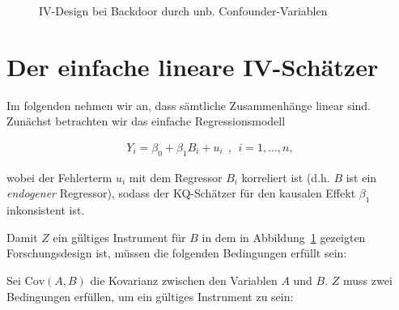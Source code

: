 \documentclass[
  a4paper,
  DIV=11,
  oneside]{scrreprt}
\begin{document}
\begin{figure}[t]


\caption{\label{fig-IVDAG1}IV-Design bei Backdoor durch unb.
Confounder-Variablen}

\end{figure}%

\section{Der einfache lineare
IV-Schätzer}\label{der-einfache-lineare-iv-schuxe4tzer}

Im folgenden nehmen wir an, dass sämtliche Zusammenhänge linear sind.
Zunächst betrachten wir das einfache Regressionsmodell

\begin{align}
  Y_i = \beta_0 + \beta_1 B_i + u_i \ \ , \ \ i=1,\dots,n, \label{eq:simpleiv}
\end{align}

wobei der Fehlerterm \(u_i\) mit dem Regressor \(B_i\) korreliert ist
(d.h. \(B\) ist ein \emph{endogener} Regressor), sodass der KQ-Schätzer
für den kausalen Effekt \(\beta_1\) inkonsistent ist.

Damit \(Z\) ein gültiges Instrument für \(B\) in dem in
Abbildung~\ref{fig-IVDAG1} gezeigten Forschungsdesign ist, müssen die
folgenden Bedingungen erfüllt sein:

Sei \(\text{Cov}(A,B)\) die Kovarianz zwischen den Variablen \(A\) und
\(B\). \(Z\) muss zwei Bedingungen erfüllen, um ein gültiges Instrument
zu sein:
\end{document}
